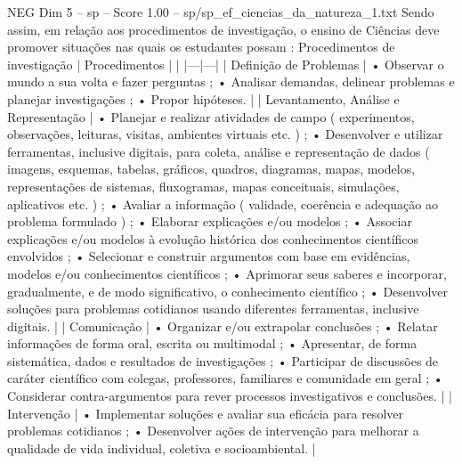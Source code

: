 \begin{textsample}{NEG Dim 5 – sp – Score 1.00 – sp/sp\_ef\_ciencias\_da\_natureza\_1.txt}
Sendo assim, em relação aos procedimentos de investigação, o ensino de Ciências deve promover situações nas quais os estudantes possam : Procedimentos de investigação | Procedimentos | | |---|---| | Definição de Problemas | • Observar o mundo a sua volta e fazer perguntas ; • Analisar demandas, delinear problemas e planejar investigações ; • Propor hipóteses. | | Levantamento, Análise e Representação | • Planejar e realizar atividades de campo ( experimentos, observações, leituras, visitas, ambientes virtuais etc. ) ; • Desenvolver e utilizar ferramentas, inclusive digitais, para coleta, análise e representação de dados ( imagens, esquemas, tabelas, gráficos, quadros, diagramas, mapas, modelos, representações de sistemas, fluxogramas, mapas conceituais, simulações, aplicativos etc. ) ; • Avaliar a informação ( validade, coerência e adequação ao problema formulado ) ; • Elaborar explicações e/ou modelos ; • Associar explicações e/ou modelos à evolução histórica dos conhecimentos científicos envolvidos ; • Selecionar e construir argumentos com base em evidências, modelos e/ou conhecimentos científicos ; • Aprimorar seus saberes e incorporar, gradualmente, e de modo significativo, o conhecimento científico ; • Desenvolver soluções para problemas cotidianos usando diferentes ferramentas, inclusive digitais. | | Comunicação | • Organizar e/ou extrapolar conclusões ; • Relatar informações de forma oral, escrita ou multimodal ; • Apresentar, de forma sistemática, dados e resultados de investigações ; • Participar de discussões de caráter científico com colegas, professores, familiares e comunidade em geral ; • Considerar contra-argumentos para rever processos investigativos e conclusões. | | Intervenção | • Implementar soluções e avaliar sua eficácia para resolver problemas cotidianos ; • Desenvolver ações de intervenção para melhorar a qualidade de vida individual, coletiva e socioambiental. |

\end{textsample}
